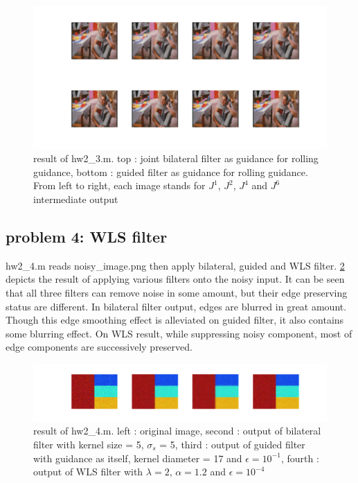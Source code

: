 \documentclass[extendedabs]{bmvc2k}
\begin{document}
\begin{figure}[h]
    \centering
    \includegraphics[width=\linewidth]{hw2_3_1}
    \caption{result of hw2\_3.m. top : joint bilateral filter as guidance for
    rolling guidance, bottom : guided filter as guidance for rolling guidance.
    From left to right, each image stands for $J^1$, $J^2$, $J^4$ and $J^6$
    intermediate output}
    \label{fig:10}
\end{figure}

\subsection*{problem 4: WLS filter}

hw2\_4.m reads noisy\_image.png then apply bilateral, guided and WLS filter. 
\figurename{\ref{fig:11}} depicts the result of applying various filters onto the noisy input. 
It can be seen that all three filters can remove noise in some amount, but their 
edge preserving status are different. In bilateral filter output, edges are blurred in
great amount. Though this edge smoothing effect is alleviated on guided filter, it also
contains some blurring effect. On WLS result, while suppressing noisy component, most of 
edge components are successively preserved.

\begin{figure}[h]
    \centering
    \includegraphics[width=\linewidth]{hw2_4_1}
    \caption{result of hw2\_4.m. left : original image, second : output of bilateral filter 
    with kernel size = 5, $\sigma_s$ = 5, third : output of guided filter with guidance as
    itself, kernel diameter = 17 and $\epsilon = 10^{-1}$, fourth : output of WLS filter with
    $\lambda = 2$, $\alpha = 1.2$ and $\epsilon = 10^{-4}$}
    \label{fig:11}
\end{figure}
\end{document}
